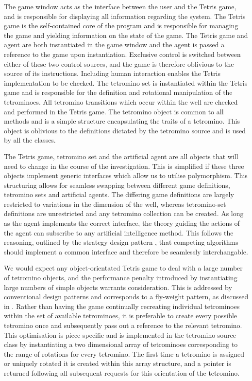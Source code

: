 \documentclass{rucsthesis}
\begin{document}
The game window acts as the interface between the user and the Tetris game, and is responsible for displaying all information regarding the system. The Tetris game is the self-contained core of the program and is responsible for managing the game and yielding information on the state of the game. The Tetris game and agent are both instantiated in the game window and the agent is passed a reference to the game upon instantiation. Exclusive control is switched between either of these two control sources, and the game is therefore oblivious to the source of its instructions.  Including human interaction enables the Tetris implementation to be checked. The tetromino set is instantiated within the Tetris game and is responsible for the definition and rotational manipulation of the tetrominoes. All tetromino transitions which occur within the well are checked and performed in the Tetris game. The tetromino object is common to all methods and is a simple structure encapsulating the traits of a tetromino. This object is oblivious to the definitions dictated by the tetromino source and is used by all the classes.

The Tetris game, tetromino set and the artificial agent are all objects that will need to change in the course of the investigation. This is simplified if these three objects implement generic interfaces which allow us to utilise polymorphism. This structuring allows for seamless swapping between different game definitions, tetromino sets and artificial agents. The differing game definitions are largely restricted to variations in the dimension of the well, whereas tetromino-set definitions are unrestricted and any tetromino collection can be created. As long as the agent implements the correct interface, the theory guiding the actions of the agent can subscribe to any artificial intelligence method. This follows the reasoning, outlined by the strategy design pattern \citep{designp}, that competing algorithms should implement a common interface and therefore be seamlessly interchangable.

We would expect any object-orientated Tetris game to deal with a large number of tetromino objects, and the performance penalty introduced by instantiating large numbers of simple objects warrants consideration. This is addressed by conventional design patterns and corresponds to a fly-weight pattern, as discussed in \cite{designp}. Rather than having the game continually recreating individual tetrominoes within the set of available tetrominoes, it is preferable to create every possible tetromino once and subsequently pass out a reference to the relevant tetromino. This optimisation is piece-specific and is implemented in the tetromino source class by instantiating a two dimensional array of tetrominoes corresponding to the range of rotations for every tetromino. The first time a tetromino is assigned or uniquely rotated it is created within this array structure, and a pointer is returned following all subsequent requests for this orientation of the tetromino.
\end{document}
